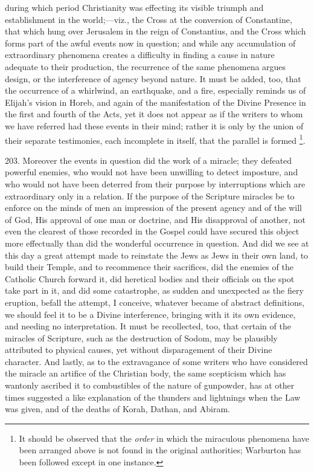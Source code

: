 during which period Christianity was effecting its visible triumph and
establishment in the world;—viz., the Cross at the conversion of
Constantine, that which hung over Jerusalem in the reign of
Constantius, and the Cross which forms part of the awful events now in
question; and while any accumulation of extraordinary phenomena
creates a difficulty in finding a cause in nature adequate to their
production, the recurrence of the same phenomena argues design, or the
interference of agency beyond nature. It must be added, too, that the
occurrence of a whirlwind, an earthquake, and a fire, especially
reminds us of Elijah's vision in Horeb, and again of the manifestation
of the Divine Presence in the first and fourth of the Acts, yet it
does not appear as if the writers to whom we have referred had these
events in their mind; rather it is only by the union of their separate
testimonies, each incomplete in itself, that the parallel is formed \footnote{It should be observed that the \emph{order} in which the miraculous
phenomena have been arranged above is not found in the original
authorities; Warburton has been followed except in one instance.}.

203.
Moreover the events in question did the work of a miracle; they
defeated powerful enemies, who would not have been unwilling to detect
imposture, and who would not have been deterred from their purpose by
interruptions which are extraordinary only in a relation. If the
purpose of the Scripture miracles be to enforce on the minds of men an
impression of the present agency and of the will of God, His approval
of one man or doctrine, and His disapproval of another, not even the
clearest of those recorded in the Gospel could have secured this
object more effectually than did the wonderful occurrence in question.
And did we see at this day a great attempt made to reinstate the Jews
as Jews in their own land, to build their Temple, and to recommence
their sacrifices, did the enemies of the Catholic Church forward it,
did heretical bodies and their officials on the spot take part in it,
and did some catastrophe, as sudden and unexpected as the fiery
eruption, befall the attempt, I conceive, whatever became of abstract
definitions, we should feel it to be a Divine interference, bringing
with it its own evidence, and needing no interpretation. It must be
recollected, too, that certain of the miracles of Scripture, such as
the destruction of Sodom, may be plausibly attributed to physical
causes, yet without disparagement of their Divine character. And
lastly, as to the extravagance of some writers who have considered the
miracle an artifice of the Christian body, the same scepticism which
has wantonly ascribed it to combustibles of the nature of gunpowder,
has at other times suggested a like explanation of the thunders and
lightnings when the Law was given, and of the deaths of Korah, Dathan,
and Abiram.

